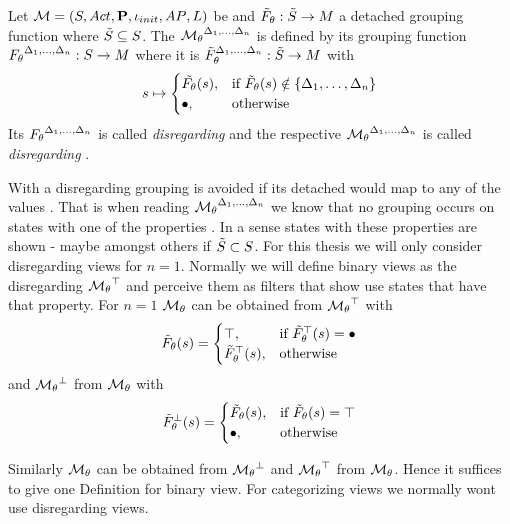\documentclass[preview]{standalone}
\begin{document}
\begin{definition}
	Let ${{{\mathcal{M}}}} = {{({S}, {Act}, {\textbf{P}}, {\iota_{init}}, {AP}, {L})}}$ be \achgphN and ${\tilde{F}_{{\theta}}} : {\tilde{{S}}} \to {\ensuremath{{M}}}$ a detached grouping function where ${\tilde{{S}}} \subseteq {S}$. The \viewN ${{{{\mathcal{M}}}}_{{\theta}}}^{{{\Delta}_1, \dots, {\Delta}_n}}$ is defined by its grouping function ${F_{{\theta}}}^{{{\Delta}_1, \dots, {\Delta}_n}} : {S} \to {\ensuremath{{M}}}$ where it is ${\tilde{F}_{{\theta}}}^{{{\Delta}_1, \dots, {\Delta}_n}} : {\tilde{{S}}} \to {\ensuremath{{M}}}$ with
	\[
	\state \mapsto
	\begin{cases}
		\tilde\grpfct(\state),				& \text{if } \grpfctsub(\state) \notin \{\disregardelements\} \\ 		\remelem,          	& \text{otherwise}
	\end{cases}
	\]
	Its \grpfctN ${F_{{\theta}}}^{{{\Delta}_1, \dots, {\Delta}_n}}$ is called \grpfct \emph{disregarding} \disregardelements and the respective \viewN ${{{{\mathcal{M}}}}_{{\theta}}}^{{{\Delta}_1, \dots, {\Delta}_n}}$ is called \view \emph{disregarding} \disregardelements. 
\end{definition}

With a disregarding \viewN grouping is avoided if its detached \grpfctN would map to any of the values \disregardelements. That is when reading ${{{{\mathcal{M}}}}_{{\theta}}}^{{{\Delta}_1, \dots, {\Delta}_n}}$ we know that no grouping occurs on states with one of the properties \disregardelements. In a sense states with these properties are shown - maybe amongst others if ${\tilde{{S}}} \subset {S}$. For this thesis we will only consider disregarding views for $n = 1$. Normally we will define binary views as the disregarding ${{{{\mathcal{M}}}}_{{\theta}}}^{\top}$ and perceive them as filters that show use states that have that property. 
For $n = 1$ ${{{{\mathcal{M}}}}_{{\theta}}}$ can be obtained from ${{{{\mathcal{M}}}}_{{\theta}}}^{\top}$ with 
\[
{\tilde{F}_{{\theta}}}({s}) = 
\begin{cases}
	{\top},				& \text{if } {\tilde{F}_{\ensuremath{{\theta}}}}^{\top}({s}) = {\bullet}  \\
	{\tilde{F}_{{\theta}}}^{\top}({s}),       		& \text{otherwise }
\end{cases}
\]
and ${{{{\mathcal{M}}}}_{{\theta}}}^{\bot}$ from ${{{{\mathcal{M}}}}_{{\theta}}}$ with
\[
{\tilde{F}_{{\theta}}}^{\bot}({s}) = 
\begin{cases}
	{\tilde{F}_{\ensuremath{{\theta}}}}({s}),       		&\text{if } {\tilde{F}_{\ensuremath{{\theta}}}}({s}) = {\top}  \\ 
	{\bullet},				&\text{otherwise } 
\end{cases}
\]

Similarly ${{{{\mathcal{M}}}}_{{\theta}}}$ can be obtained from ${{{{\mathcal{M}}}}_{{\theta}}}^{\bot}$ and ${{{{\mathcal{M}}}}_{{\theta}}}^{\top}$ from ${{{{\mathcal{M}}}}_{{\theta}}}$. Hence it suffices to give one Definition for binary view. For categorizing views we normally wont use disregarding views.

\end{document}
